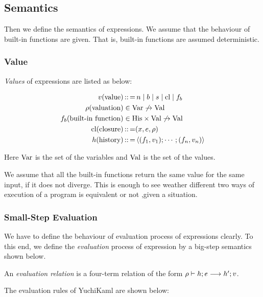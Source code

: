 
\subsection{Semantics}

Then we define the semantics of expressions.
We assume that the behaviour of built-in functions are given.
That is, built-in functions are assumed deterministic.

\subsubsection{Value}
\emph{Values} of expressions are listed as below:

\begin{align*}
    v (\text{value}) &\operatorname{:\!:=} n \mid b \mid  s \mid  \text{cl} \mid  f_b\\
    \rho  (\text{valuation}) &\in \text{Var} \not\to\text{Val} \\
    f_b{} (\text{built-in function})&\in \text{His} \times\text{Val}\not\to\text{Val}\\
    \text{cl} (\text{closure}) &\operatorname{:\!:=} (x,e,\rho{})\\
    h (\text{history}) &\operatorname{:\!:=} \left\langle (f_1, v_1); \cdots; (f_n, v_n) \right\rangle
\end{align*}



Here $\text{Var}$ is the set of the variables and $\text{Val}$ is the set of the values.

\begin{note}
We assume that all the built-in functions return the same value for the same input, if it does not diverge.
This is enough to see weather different two ways of execution of a program is equivalent or not ,given a situation.
\end{note}

\subsubsection{Small-Step Evaluation}
We have to define the behaviour of evaluation process of expressions clearly.
To this end, we define the \emph{evaluation} process of expression by a big-step semantics shown below.

An \emph{evaluation relation} is a four-term relation of the form $\rho \vdash h; e \longrightarrow h'; v$.

The evaluation rules of YuchiKaml are shown below:

\infrule[E-Var]
{}
{}

